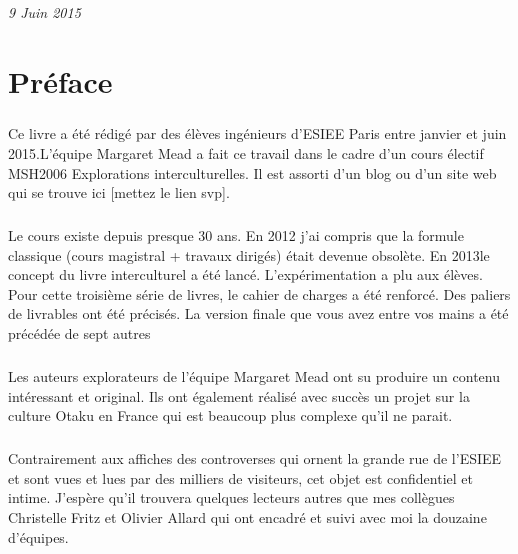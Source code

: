 \documentclass[12pt,twoside]{book}
\begin{document}
\begin{titlepage}
\begin{sffamily}
\begin{center}
\begin{minipage}{0.4\textwidth}
\begin{flushright}
				\emph{9 Juin 2015}
	  \end{flushright}
	\end{minipage} 
	\end{center}
	\end{sffamily}
\end{titlepage}

\thispagestyle{empty}

\frontmatter

\thispagestyle{plain}

\chapter*{Préface}

\paragraph{} Ce livre a été rédigé par des élèves ingénieurs d'ESIEE Paris
entre janvier et juin 2015.L'équipe Margaret Mead a fait ce travail dans le
cadre d'un cours électif MSH2006 Explorations interculturelles. Il est assorti
d'un blog ou d'un site web qui se trouve ici [mettez le lien svp].

\paragraph{} Le cours existe depuis presque 30 ans.  En 2012 j'ai compris que
la formule classique (cours magistral + travaux dirigés) était devenue
obsolète.  En 2013le concept du livre interculturel a été lancé.
L'expérimentation a plu aux élèves.  Pour cette troisième série de livres, le
cahier de charges a été renforcé. Des paliers de livrables ont été précisés. La
version finale que vous avez entre vos mains a été précédée de sept autres

\paragraph{} Les auteurs explorateurs de l'équipe Margaret Mead ont su produire
un contenu intéressant et original. Ils ont également réalisé avec succès un
projet sur la culture Otaku en France qui est beaucoup plus complexe qu'il ne
parait.

\paragraph{} Contrairement aux affiches des controverses qui ornent la grande
rue de l'ESIEE et sont vues et lues par des milliers de visiteurs, cet objet
est confidentiel et intime.  J'espère qu'il trouvera quelques lecteurs autres
que mes collègues Christelle Fritz et Olivier Allard qui ont encadré et suivi
avec moi la douzaine d'équipes.
\end{document}
